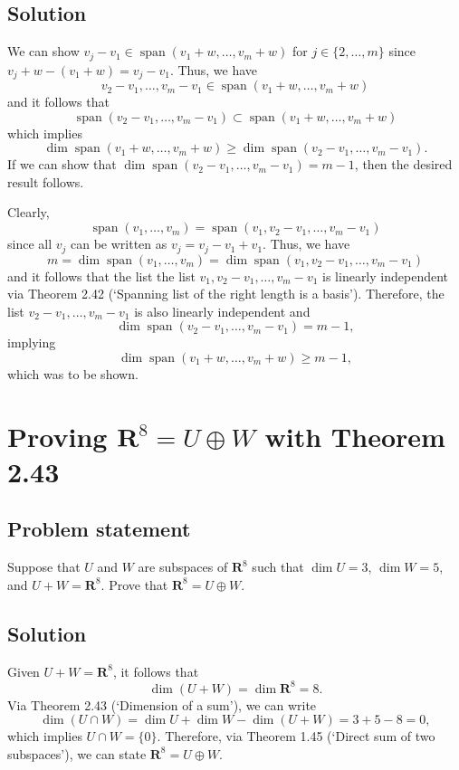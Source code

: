 \documentclass{article}
\begin{document}
\subsection*{Solution}
We can show $v_j-v_1\in\operatorname{span}(v_1+w,\ldots,v_m+w)$ for $j\in\{2,\ldots,m\}$ since $v_j+w-(v_1+w)=v_j-v_1$. Thus, we have 
\[v_2-v_1,\ldots,v_m-v_1\in\operatorname{span}(v_1+w,\ldots,v_m+w)\]
and it follows that
\[\operatorname{span}(v_2-v_1,\ldots,v_m-v_1)\subset\operatorname{span}(v_1+w,\ldots,v_m+w)\]
which implies
\[\operatorname{dim}\operatorname{span}(v_1+w,\ldots,v_m+w)\geq\operatorname{dim}\operatorname{span}(v_2-v_1,\ldots,v_m-v_1).\]
If we can show that $\operatorname{dim}\operatorname{span}(v_2-v_1,\ldots,v_m-v_1)=m-1$, then the desired result follows.

Clearly, 
\[\operatorname{span}(v_1,\dots,v_m)=\operatorname{span}(v_1,v_2-v_1,\ldots,v_m-v_1)\]
since all $v_j$ can be written as $v_j=v_j-v_1+v_1$. 
Thus, we have
\[m=\operatorname{dim}\operatorname{span}(v_1,\dots,v_m)=\operatorname{dim}\operatorname{span}(v_1,v_2-v_1,\ldots,v_m-v_1)\]
and it follows that the list the list $v_1,v_2-v_1,\ldots,v_m-v_1$ is linearly independent via Theorem 2.42 (`Spanning list of the right length is a basis'). 
Therefore, the list $v_2-v_1,\ldots,v_m-v_1$ is also linearly independent and
\[\operatorname{dim}\operatorname{span}(v_2-v_1,\ldots,v_m-v_1)=m-1,\]
implying 
\[\operatorname{dim}\operatorname{span}(v_1+w,\ldots,v_m+w)\geq m-1,\]
which was to be shown.

\clearpage

\renewcommand{\thesection}{11}
\section{Proving $\mathbf{R}^8=U\oplus W$ with Theorem 2.43}
\subsection*{Problem statement}
Suppose that $U$ and $W$ are subspaces of $\mathbf{R}^8$ such that $\operatorname{dim}U=3$, $\operatorname{dim}W=5$, and $U+W=\mathbf{R}^8$. 
Prove that $\mathbf{R}^8=U\oplus W$.

\subsection*{Solution}
Given $U+W=\mathbf{R}^8$, it follows that 
\[\operatorname{dim}(U+W)=\operatorname{dim}\mathbf{R}^8=8.\]
Via Theorem 2.43 (`Dimension of a sum'), we can write
\[\operatorname{dim}(U\cap W)=\operatorname{dim}U+\operatorname{dim}W-\operatorname{dim}(U+W)=3+5-8=0,\]
which implies $U\cap W=\{0\}$. 
Therefore, via Theorem 1.45 (`Direct sum of two subspaces'), we can state $\mathbf{R}^8=U\oplus W$.
\end{document}
